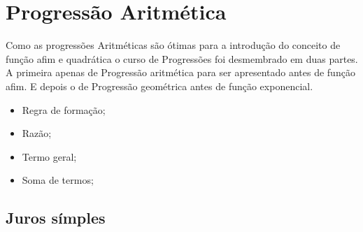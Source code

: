 \chapter{Progressão Aritmética}
Como as progressões Aritméticas são ótimas para a introdução do conceito de função afim e quadrática o curso de Progressões foi desmembrado em duas partes. A primeira apenas de Progressão aritmética para ser apresentado antes de função afim. E depois o de Progressão geométrica antes de função exponencial.

\begin{itemize}
 \item Regra de formação;
 \item Razão;
 \item Termo geral;
 \item Soma de termos;
\end{itemize}

\section{Juros símples}

